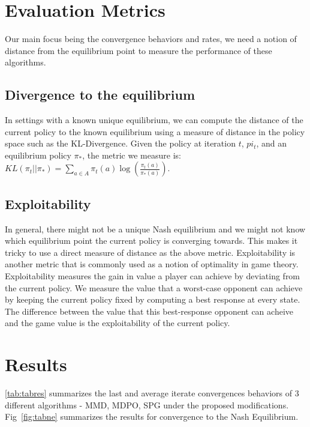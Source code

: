 \section{Evaluation
  Metrics}
Our main focus being the convergence behaviors and rates, we need a notion of distance from the
equilibrium point to measure the performance of these algorithms.

\subsection{Divergence to the equilibrium}
In settings with a known unique equilibrium, we can compute the distance of the current policy to
the known equilibrium using a measure of distance in the policy space such as the KL-Divergence.
Given the policy at iteration $t$, $pi_t$, and an equilibrium policy $\pi_*$, the metric we measure
is: $KL(\pi_t || \pi_*) = \sum_{a \in A} \pi_t(a) \log \left( \frac{\pi_t(a)}{\pi_*(a)} \right)$.

\subsection{Exploitability}
In general, there might not be a unique Nash equilibrium and we might not know which equilibrium
point the current policy is converging towards.
This makes it tricky to use a direct measure of distance as the above metric.
Exploitability is another metric that is commonly used as a notion of optimality in game theory.
Exploitability measures the gain in value a player can achieve by deviating from the current
policy.
We measure the value that a worst-case opponent can achieve by keeping the current policy fixed by
computing a best response at every state.
The difference between the value that this best-response opponent can acheive and the game value is
the exploitability of the current policy.


\section{Results} \ref{tab:tabres} summarizes the last and average
iterate convergences behaviors of 3 different algorithms - MMD, MDPO, SPG under the proposed
modifications.
Fig~\ref{fig:tabne} summarizes the results for convergence to the Nash Equilibrium.

